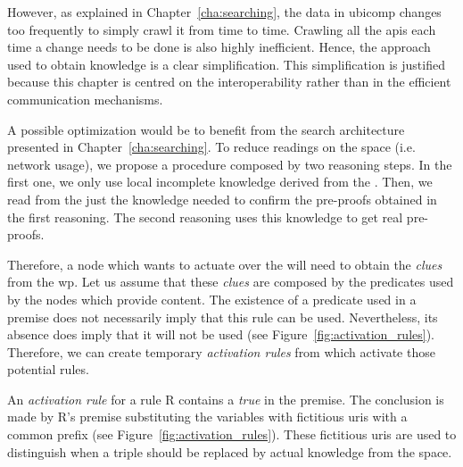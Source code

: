However, as explained in Chapter~\ref{cha:searching}, the data in \ac{ubicomp} changes too frequently to simply crawl it from time to time.
Crawling all the \acsp{api} each time a change needs to be done is also highly inefficient.
Hence, the approach used to obtain knowledge is a clear simplification.
This simplification is justified because this chapter is centred on the interoperability rather than in the efficient communication mechanisms.


\bigskip


A possible optimization would be to benefit from the search architecture presented in Chapter~\ref{cha:searching}.
To reduce readings on the space (i.e. network usage), we propose a procedure composed by two reasoning steps.
In the first one, we only use local incomplete knowledge derived from the \clues{}.
Then, we read from the \Space{} just the knowledge needed to confirm the pre-proofs obtained in the first reasoning.
The second reasoning uses this knowledge to get real pre-proofs. %


Therefore, a node which wants to actuate over the \Space{} will need to obtain the \emph{clues} from the \ac{wp}.
Let us assume that these \emph{clues} are composed by the predicates used by the nodes which provide content. %
The existence of a predicate used in a premise does not necessarily imply that this rule can be used.
Nevertheless, its absence does imply that it will not be used (see Figure~\ref{fig:activation_rules}).
Therefore, we can create temporary \emph{activation rules} from \clues{} which activate those potential rules. %




An \emph{activation rule} for a rule R contains a \emph{true} in the premise.
The conclusion is made by R's premise substituting the variables with fictitious \acsp{uri} with a common prefix (see Figure~\ref{fig:activation_rules}).
These fictitious \acsp{uri} are used to distinguish when a triple should be replaced by actual knowledge from the space. %




